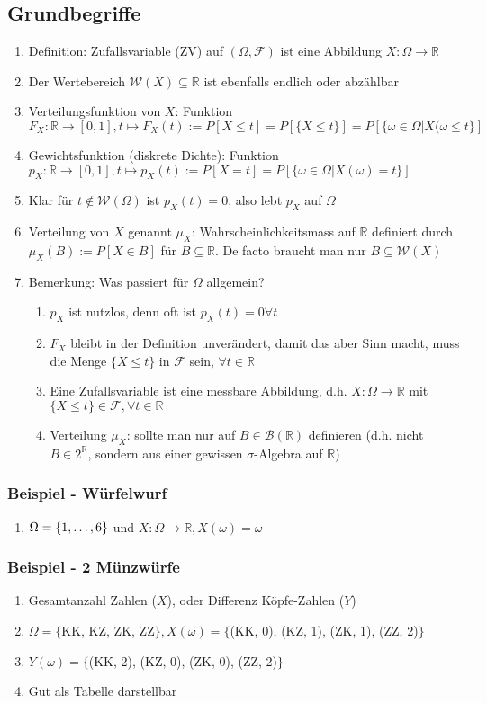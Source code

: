 \documentclass[10pt]{article}
\newcommand{\enumstart}{\begin{enumerate}}
\newcommand{\enumend}{\end{enumerate}}
\newcommand{\R}{\mathbb{R}}
\newcommand{\F}{\mathcal{F}}
\newcommand{\W}{\mathcal{W}}
\newcommand{\B}{\mathcal{B}}
\begin{document}
\subsection{Grundbegriffe}
\enumstart
	\item Definition: Zufallsvariable (ZV) auf $(\Omega, \F)$ ist eine Abbildung $X: \Omega \rightarrow \R$
	\item Der Wertebereich $\W(X) \subseteq \R$ ist ebenfalls endlich oder abzählbar
	\item Verteilungsfunktion von $X$: Funktion $F_X: \R \rightarrow [0,1], t\mapsto F_X(t) := P[X \le t] = P[\{X \le t\}] = P[\{\omega \in \Omega | X(\omega \le t\}]$
	\item Gewichtsfunktion (diskrete Dichte): Funktion $p_X: \R \rightarrow [0,1], t \mapsto p_X(t) := P[X = t] = P[\{\omega \in \Omega | X(\omega) = t\}]$
	\item Klar für $t \notin \W(\Omega)$ ist $p_X(t) = 0$, also lebt $p_X$ auf $\Omega$
	\item Verteilung von $X$ genannt $\mu_X$: Wahrscheinlichkeitsmass auf $\R$ definiert durch $\mu_X(B) := P[X \in B]$ für $B \subseteq \R$. De facto braucht man nur $B \subseteq \W(X)$
	\item Bemerkung: Was passiert für $\Omega$ allgemein?
	\enumstart
		\item $p_X$ ist nutzlos, denn oft ist $p_X(t) = 0 \forall t$
		\item $F_X$ bleibt in der Definition unverändert, damit das aber Sinn macht, muss die Menge $\{X \le t\}$ in $\F$ sein, $\forall t \in \R$
		\item Eine Zufallsvariable ist eine messbare Abbildung, d.h. $X: \Omega \rightarrow \R$ mit $\{X \le t\} \in \F, \forall t \in \R$
		\item Verteilung $\mu_X$: sollte man nur auf $B \in \B(\R)$ definieren (d.h. nicht $B \in 2^\R$, sondern aus einer gewissen $\sigma$-Algebra auf $\R$)
	\enumend
\enumend

\subsubsection{Beispiel - Würfelwurf}
\enumstart
	\item $\Omega = \{1, \mathellipsis, 6\}$ und $X: \Omega \rightarrow \R, X(\omega) = \omega$
\enumend

\subsubsection{Beispiel - 2 Münzwürfe}
\enumstart
	\item Gesamtanzahl Zahlen ($X$), oder Differenz Köpfe-Zahlen ($Y$)
	\item $\Omega = \{$KK, KZ, ZK, ZZ$\}, X(\omega) = \{$(KK, 0), (KZ, 1), (ZK, 1), (ZZ, 2)$\}$
	\item $Y(\omega) = \{$(KK, 2), (KZ, 0), (ZK, 0), (ZZ, 2)$\}$
	\item Gut als Tabelle darstellbar
\enumend
\end{document}
